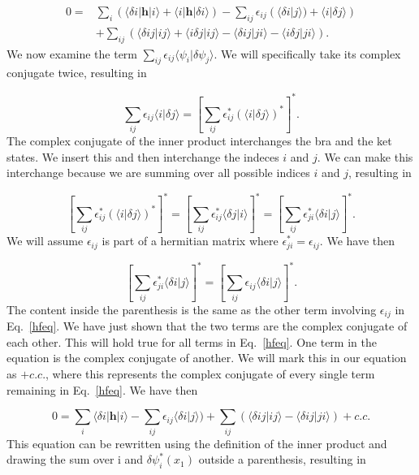 \documentclass[a4paper,norsk,11pt,twoside]{report}
\begin{document}
\begin{align}
0 = & \sum_i (
 \langle \delta i | \textbf{h} | i \rangle
 + \langle i | \textbf{h} | \delta i \rangle )
 - \sum_{ij} \epsilon_{ij} ( \langle \delta i | j \rangle)
+ \langle i | \delta j \rangle )
  \nonumber \\ &
 + \sum_{ij} (
  \langle \delta i j | i j \rangle 
 + \langle  i \delta j | i j \rangle
 - \langle \delta i j | j i \rangle 
 - \langle i \delta j | j i \rangle ) .
 \label{hfeq}
\end{align}
We now examine the term $\sum_{ij} \epsilon_{ij} \langle \psi_i | \delta \psi_j \rangle$. 
We will specifically take its complex conjugate twice, resulting in

\begin{equation}
\sum_{ij} \epsilon_{ij} \langle i | \delta j \rangle
= \left[ \sum_{ij} \epsilon_{ij}^* \left( \langle i | \delta j \rangle \right)^* \right]^* .
\end{equation}
The complex conjugate of the inner product interchanges the bra and
the ket states. We insert this and then interchange the indeces $i$ and $j$. We
can make this interchange because we are summing over all possible indices $i$
and $j$, resulting in

\begin{equation}
\left[ \sum_{ij} \epsilon_{ij}^* \left( \langle i | \delta j \rangle \right)^* \right]^* 
= \left[ \sum_{ij} \epsilon_{ij}^*  \langle \delta j | i \rangle \right]^*
=  \left[ \sum_{ij} \epsilon_{ji}^*  \langle \delta i | j \rangle \right]^* .
\end{equation}
We will assume $\epsilon_{ij}$ is part of a hermitian matrix where $\epsilon_{ji}^* = \epsilon_{ij}$. 
We have then 

\begin{equation}
\left[ \sum_{ij} \epsilon_{ji}^*  \langle \delta i | j \rangle \right]^* = \left[ \sum_{ij} \epsilon_{ij} \langle \delta i | j \rangle \right]^* .
\end{equation}
The content inside the parenthesis is the same as the other term
involving $\epsilon_{ij}$ in Eq.~\eqref{hfeq}. We have just shown that
the two terms are the complex conjugate of each other. This will hold
true for all terms in Eq.~\eqref{hfeq}. One term in the equation
is the complex conjugate of another. We will mark this in our equation
as $+ c.c.$, where this represents the complex conjugate of every
single term remaining in Eq.~\eqref{hfeq}. We have then

\begin{equation}
0 =  \sum_i 
 \langle \delta i | \textbf{h} | i \rangle
 - \sum_{ij} \epsilon_{ij} \langle \delta i | j \rangle)
 + \sum_{ij} (
 \langle \delta i j | i j \rangle 
 - \langle \delta i j | j i \rangle  ) + c.c .
\end{equation}
This equation can be rewritten using the definition of the inner product and drawing the sum over i and $\delta \psi_i^*(x_1)$ outside a parenthesis, resulting in 
\end{document}
